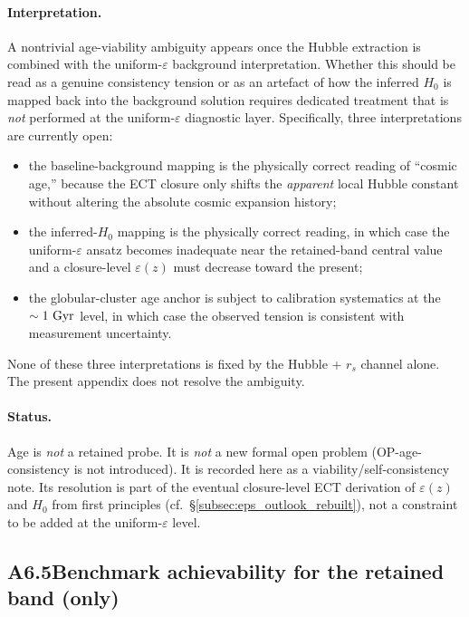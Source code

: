 \paragraph{Interpretation.}
A nontrivial age-viability ambiguity appears once the Hubble
extraction is combined with the uniform-$\varepsilon$ background
interpretation. Whether this should be read as a genuine
consistency tension or as an artefact of how the inferred $H_0$
is mapped back into the background solution requires dedicated
treatment that is \emph{not} performed at the uniform-$\varepsilon$
diagnostic layer. Specifically, three interpretations are
currently open:
\begin{itemize}
\item the baseline-background mapping is the physically correct
  reading of ``cosmic age,'' because the ECT closure only
  shifts the \emph{apparent} local Hubble constant without
  altering the absolute cosmic expansion history;
\item the inferred-$H_0$ mapping is the physically correct
  reading, in which case the uniform-$\varepsilon$ ansatz
  becomes inadequate near the retained-band central value and
  a closure-level $\varepsilon(z)$ must decrease toward the
  present;
\item the globular-cluster age anchor is subject to calibration
  systematics at the $\sim 1~{\rm Gyr}$ level, in which case
  the observed tension is consistent with measurement
  uncertainty.
\end{itemize}
None of these three interpretations is fixed by the
Hubble + $r_s$ channel alone. The present appendix does not
resolve the ambiguity.

\paragraph{Status.}
Age is \emph{not} a retained probe. It is \emph{not} a new formal
open problem (OP-age-consistency is not introduced). It is
recorded here as a viability/self-consistency note. Its
resolution is part of the eventual closure-level ECT derivation
of $\varepsilon(z)$ and $H_0$ from first principles (cf.\
\S\ref{subsec:eps_outlook_rebuilt}), not a constraint to be added
at the uniform-$\varepsilon$ level.

\subsection*{A6.5\quad Benchmark achievability for the retained
band (only)}

